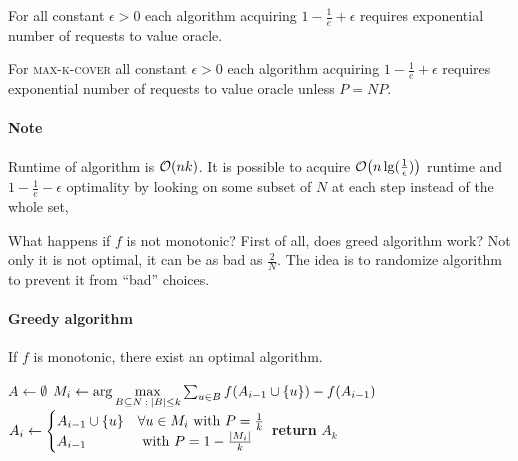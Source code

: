 \begin{theorem} 
	For all constant $\epsilon>0$ each algorithm acquiring $1-\frac{1}{e} + \epsilon$ requires exponential number of requests to value oracle.
\end{theorem}
\begin{theorem}
For \textsc{max-k-cover} all constant $\epsilon>0$ each algorithm acquiring $1-\frac{1}{e} + \epsilon$ requires exponential number of requests to value oracle unless $P=NP$.
\end{theorem}
\paragraph{Note} Runtime of algorithm is $\order{nk}$. It is possible to acquire $\order{n\lg(\frac{1}{\epsilon})}$ runtime and $1-\frac{1}{e}-\epsilon$ optimality by looking on some subset of $N$ at each step instead of the whole set, 

What happens if $f$ is not monotonic? First of all, does greed algorithm work? Not only it is not optimal, it can be as bad as $\frac{2}{N}$. The idea is to randomize algorithm to prevent it from ``bad'' choices.


\paragraph{Greedy algorithm}
If $f$ is monotonic, there exist an optimal algorithm.
\begin{algorithm}
	\caption{}\label{rand_greedy}
	\begin{algorithmic}[1]
		\State $A \gets \emptyset$
		\State $ M_i \gets \arg\max\limits_{B\subseteq N \: : \: \abs{B} \leq k} \sum_{u\in B} f\qty(A_{i-1} \cup \qty{u} ) - f\qty(A_{i-1})$
		\State $ A_i \gets \begin{cases}
		A_{i-1} \cup \qty{u} & \forall u \in M_i \text{ with } P=\frac{1}{k}\\
		A_{i-1} & \text{ with } P=1-\frac{\abs{M_i}}{k}
		\end{cases} $
		\EndFor
		\State \textbf{return} $A_k$
		\EndProcedure
	\end{algorithmic}
\end{algorithm}

